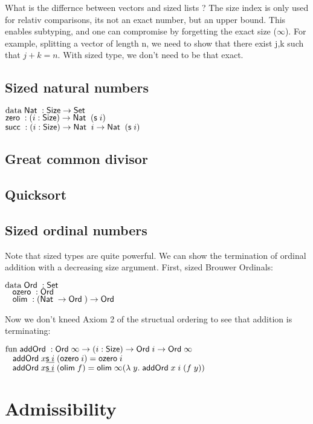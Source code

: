 What is the differnce between vectors and sized lists ?
The size index is only used for relativ comparisons, its not an exact number, but an upper bound.
This enables subtyping, and one can compromise by forgetting the exact size ($\infty$).
For example, splitting a vector of length n, we need to show that there exist j,k such that $j+k = n$.
With sized type, we don't need to be that exact.
\subsection{Sized natural numbers}
\begin{bsp}
$\mathrm{data}\; \mathsf{Nat}\; : \mathsf{Size} \rightarrow \mathsf{Set} $ \\
$\mathsf{zero}\; : ( i : \mathsf{Size} ) \rightarrow{ \mathsf{Nat}\;\; (\mathsf{s}\;i)} $\\
$\mathsf{succ}\; : ( i : \mathsf{Size} ) \rightarrow{ \mathsf{Nat}\;\; i \rightarrow\mathsf{Nat}\;\; (\mathsf{s}\;i)} $
\end{bsp}

\subsection{Great common divisor}

\subsection{Quicksort}

\subsection{Sized ordinal numbers}
Note that sized types are quite powerful. 
We can show the termination of ordinal addition with a decreasing size argument.
First, sized Brouwer Ordinals:
\begin{bsp}
$\mathrm{data}\; \mathsf{Ord}\; : \mathsf{Set}$ \\
$\hspace*{3mm} \mathsf{ozero}\; : \mathsf{Ord}\; $\\
$\hspace*{3mm} \mathsf{olim}\; : (\mathsf{Nat}\; \rightarrow \mathsf{Ord}\; ) \rightarrow \mathsf{Ord}\; $
\end{bsp}
Now we don't kneed Axiom 2 of the structual ordering to see that addition is terminating:
\begin{bsp}
$\mathrm{fun}\; \mathsf{addOrd}\; : \mathsf{Ord}\; \infty \rightarrow ( i : \mathsf{Size} ) \rightarrow{\mathsf{Ord}\;i \rightarrow\mathsf{Ord}\;\infty }$\\
$\hspace*{3mm} \mathsf{addOrd}\; x \underline{\mathsf{s}\; i}\; (\mathsf{ozero}\; i) = \mathsf{ozero}\; i $\\
$\hspace*{3mm} \mathsf{addOrd}\; x \underline{\mathsf{s}\; i}\; (\mathsf{olim}\; f)  = \mathsf{olim}\; \infty ( \lambda\; y .\; \mathsf{addOrd}\;  x \; i \; (f \; y))  $
\end{bsp}

\section{Admissibility}
